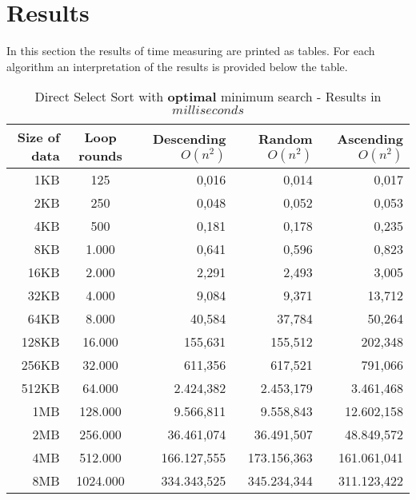 \documentclass[11pt]{amsart}
\begin{document}
\newpage
\section{Results}
In this section the results of time measuring are printed as tables. For each algorithm an interpretation of the results is provided below the table.
%
%
\begin{table}[htdp]
	\caption{Direct Select Sort with \textbf{optimal} minimum search - Results in $milliseconds$}
	\begin{tabular}{|r|c|r|r|r|} \hline
		Size of data & Loop rounds & \parbox[c]{3.5cm}{Descending \\ $O(n^2)$} & \parbox[c]{3.5cm}{Random \\$O(n^2)$} & \parbox[c]{3.5cm}{Ascending \\ $O(n^2)$} \\ \hline
		1KB & 125 & 0,016 & 0,014 & 0,017 \\ \hline
		2KB & 250 & 0,048 & 0,052 & 0,053 \\ \hline
		4KB & 500 & 0,181 & 0,178 & 0,235 \\ \hline
		8KB & 1.000 & 0,641 & 0,596 & 0,823 \\ \hline
		16KB & 2.000 & 2,291 & 2,493 & 3,005 \\ \hline
		32KB & 4.000 & 9,084 & 9,371 & 13,712 \\ \hline
		64KB & 8.000 & 40,584 & 37,784 & 50,264 \\ \hline
		128KB & 16.000 & 155,631 & 155,512 & 202,348 \\ \hline
		256KB & 32.000 & 611,356 & 617,521 & 791,066 \\ \hline
		512KB & 64.000 & 2.424,382 & 2.453,179 & 3.461,468 \\ \hline
		1MB & 128.000 & 9.566,811 & 9.558,843 & 12.602,158 \\ \hline
		2MB & 256.000 & 36.461,074 & 36.491,507 & 48.849,572 \\ \hline
		4MB & 512.000 & 166.127,555 & 173.156,363 & 161.061,041 \\ \hline
		8MB & 1024.000 & 334.343,525 & 345.234,344 & 311.123,422 \\ \hline
	\end{tabular}
	\label{default}
\end{table}%
\end{document}
